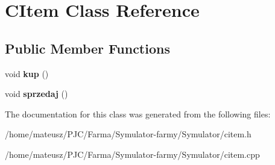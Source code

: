 \hypertarget{class_c_item}{}\section{C\+Item Class Reference}
\label{class_c_item}
\subsection*{Public Member Functions}
\begin{DoxyCompactItemize}
\item 
\mbox{\label{class_c_item_a73402e5688e23343f3bb5a6080e0e39f}} 
void {\bfseries kup} ()
\item 
\mbox{\label{class_c_item_acb8e468463ef56a044fe423c199af48b}} 
void {\bfseries sprzedaj} ()
\end{DoxyCompactItemize}


The documentation for this class was generated from the following files\+:\begin{DoxyCompactItemize}
\item 
/home/mateusz/\+P\+J\+C/\+Farma/\+Symulator-\/farmy/\+Symulator/citem.\+h\item 
/home/mateusz/\+P\+J\+C/\+Farma/\+Symulator-\/farmy/\+Symulator/citem.\+cpp\end{DoxyCompactItemize}
